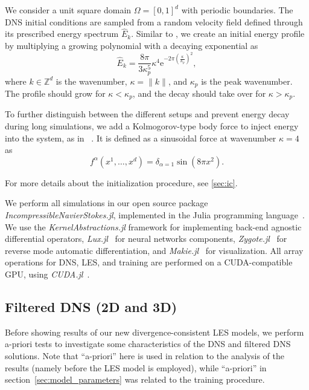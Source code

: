 \documentclass[preprint]{elsarticle}
\newcommand{\R}[1]{}
\newcommand{\revone}[1]{#1}
\begin{document}
We consider a unit square domain $\Omega = [0, 1]^d$ with periodic boundaries.
The DNS initial conditions are sampled from a random velocity field defined
through its prescribed energy spectrum $\hat{E}_k$. Similar to
\cite{Orlandi2000,San2012,Maulik2017}, we create an initial energy profile by
multiplying a growing polynomial with a decaying exponential as
\begin{equation} \label{eq:energyprofile}
    \hat{E}_k = \frac{8\pi}{3 \kappa_p^5}
    \kappa^4
    \mathrm{e}^{-2\pi \left( \frac{\kappa}{\kappa_p} \right)^2},
\end{equation}
where $k \in \mathbb{Z}^d$ is the wavenumber, $\kappa = \| k \|$, and $\kappa_p$
is the peak wavenumber. The profile should grow for $\kappa < \kappa_p$, and the
decay should take over for $\kappa > \kappa_p$.
\revone{
    \R{bodyforce}
    To further distinguish between the different setups and prevent energy decay
    during long simulations, we add a 
    Kolmogorov-type body force to inject energy into the
    system, as in ~\cite{Chandler2013,Kochkov2021,List2024}.
    It is defined as a sinusoidal force at wavenumber $\kappa = 4$ as
    \begin{equation} \label{eq:bodyforce}
        f^\alpha(x^1, \dots, x^d) = \delta_{\alpha = 1} \sin(8 \pi x^2).
    \end{equation}
}
For more details about the
initialization procedure, see \ref{sec:ic}.

We perform all simulations in our open source package
\emph{IncompressibleNavierStokes.jl}, implemented in the Julia programming
language~\cite{Bezanson2017}. We use the \emph{KernelAbstractions.jl}
\cite{Churavy2023} framework for implementing back-end agnostic differential
operators, \emph{Lux.jl}~\cite{Pal2023} for neural networks components,
\emph{Zygote.jl}~\cite{Innes2018} for reverse mode automatic differentiation,
and \emph{Makie.jl}~\cite{Danisch2021} for visualization. All array operations
for DNS, LES, and training are performed on a CUDA-compatible GPU, using
\emph{CUDA.jl}~\cite{Besard2018,Besard2019}.

\subsection{Filtered DNS (2D and 3D)} \label{sec:prioranalysis}

Before showing results of our new divergence-consistent LES models, we perform
a-priori tests to investigate some characteristics of the DNS and filtered DNS
solutions. Note that ``a-priori'' here is used in relation to the analysis of the
results (namely before the LES model is employed), while ``a-priori'' in
section~\ref{sec:model_parameters} was related to the training procedure.
\end{document}

